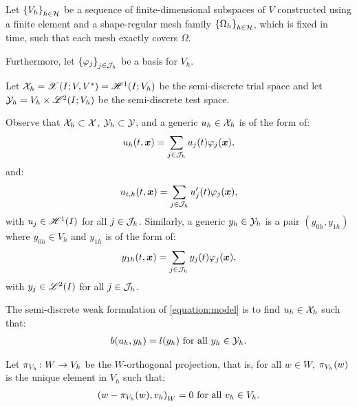 Let $\left\{ V_h \right\}_{h \in \mathcal{H}}$ be a sequence of finite-dimensional subspaces of $V$ constructed using a finite element and a shape-regular mesh family $\left\{ \Omega_{h} \right\}_{h \in \mathcal{H}}$, which is fixed in time, such that each mesh exactly covers $\Omega$.

Furthermore, let $\left\{ \varphi_j \right\}_{j \in \mathcal{J}_h}$ be a basis for $V_h$.

\begin{definition}
    Let $\mathcal{X}_h = \mathscr{X}(I; V, V^*) = \mathscr{H}^{1}(I; V_h)$ be the semi-discrete trial space and let $\mathcal{Y}_h = V_h \times \mathscr{L}^{2}(I; V_h)$ be the semi-discrete test space.
\end{definition}

Observe that $\mathcal{X}_h \subset \mathcal{X}$, $\mathcal{Y}_h \subset \mathcal{Y}$, and a generic $u_h \in \mathcal{X}_h$ is of the form of:
\begin{gather}
    u_h(t, \bm{x}) = \sum_{j \in \mathcal{J}_h} u_j(t) \varphi_j(\bm{x}),
\end{gather}
and:
\begin{gather}
    u_{t, h}(t, \bm{x}) = \sum_{j \in \mathcal{J}_h} u_j^{\prime}(t) \varphi_j(\bm{x}),
\end{gather}
with $u_j \in \mathscr{H}^{1}(I)$ for all $j \in \mathcal{J}_h$. Similarly, a generic $y_h \in \mathcal{Y}_h$ is a pair $(y_{0h}, y_{1h})$ where $y_{0h} \in V_h$ and $y_{1h}$ is of the form of:
\begin{gather}
    y_{1h}(t, \bm{x}) = \sum_{j \in \mathcal{J}_h} y_j(t) \varphi_j(\bm{x}),
\end{gather}
with $y_j \in \mathscr{L}^{2}(I)$ for all $j \in \mathcal{J}_h$.

\begin{definition}
    The semi-discrete weak formulation of \ref{equation:model} is to find $u_h \in \mathcal{X}_h$ such that:
    \begin{gather} \label{equation:weak_h1}
        b(u_h, y_h) = l(y_h) \text{ for all } y_h \in \mathcal{Y}_h.
    \end{gather}
\end{definition}

\begin{definition}[$\ProjectionOnto{V_h}$]
    Let $\pi_{V_h} \colon W \rightarrow V_h$ be the $W$-orthogonal projection, that is, for all $w \in W$, $\pi_{V_h}(w)$ is the unique element in $V_h$ such that:
    \begin{gather}
        \left( w - \pi_{V_h}(w), v_h \right)_W = 0 \text{ for all } v_h \in V_h.
    \end{gather}
\end{definition}

